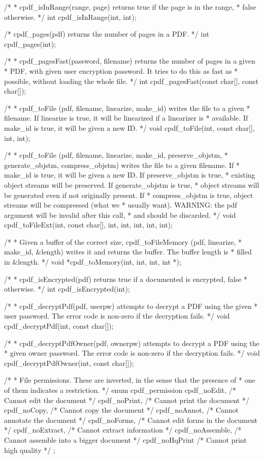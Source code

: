 /*
 * cpdf_isInRange(range, page) returns true if the page is in the range,
 * false otherwise.
 */
int cpdf_isInRange(int, int);

/* cpdf_pages(pdf) returns the number of pages in a PDF. */
int cpdf_pages(int);

/*
 * cpdf_pagesFast(password, filename) returns the number of pages in a given
 * PDF, with given user encryption password. It tries to do this as fast as
 * possible, without loading the whole file.
 */
int cpdf_pagesFast(const char[], const char[]);

/*
 * cpdf_toFile (pdf, filename, linearize, make_id) writes the file to a given
 * filename. If linearize is true, it will be linearized if a linearizer is
 * available. If make_id is true, it will be given a new ID.
 */
void cpdf_toFile(int, const char[], int, int);

/*
 * cpdf_toFile (pdf, filename, linearize, make_id, preserve_objstm,
 * generate_objstm, compress_objstm) writes the file to a given filename. If
 * make_id is true, it will be given a new ID.  If preserve_objstm is true,
 * existing object streams will be preserved. If generate_objstm is true,
 * object streams will be generated even if not originally present. If
 * compress_objstm is true, object streams will be compressed (what we
 * usually want). WARNING: the pdf argument will be invalid after this call,
 * and should be discarded.
 */
void cpdf_toFileExt(int, const char[], int, int, int, int, int);

/*
 * Given a buffer of the correct size, cpdf_toFileMemory (pdf, linearize,
 * make_id, &length) writes it and returns the buffer. The buffer length is
 * filled in &length.
 */
void *cpdf_toMemory(int, int, int, int *);

/*
 * cpdf_isEncrypted(pdf) returns true if a documented is encrypted, false
 * otherwise.
 */
int cpdf_isEncrypted(int);

/*
 * cpdf_decryptPdf(pdf, userpw) attempts to decrypt a PDF using the given
 * user password. The error code is non-zero if the decryption fails.
 */
void cpdf_decryptPdf(int, const char[]);

/*
 * cpdf_decryptPdfOwner(pdf, ownerpw) attempts to decrypt a PDF using the
 * given owner password. The error code is non-zero if the decryption fails.
 */
void cpdf_decryptPdfOwner(int, const char[]);

/*
 * File permissions. These are inverted, in the sense that the presence of
 * one of them indicates a restriction.
 */
enum cpdf_permission {
  cpdf_noEdit,     /* Cannot edit the document */
  cpdf_noPrint,    /* Cannot print the document */
  cpdf_noCopy,     /* Cannot copy the document */
  cpdf_noAnnot,    /* Cannot annotate the document */
  cpdf_noForms,    /* Cannot edit forms in the document */
  cpdf_noExtract,  /* Cannot extract information */
  cpdf_noAssemble, /* Cannot assemble into a bigger document */
  cpdf_noHqPrint   /* Cannot print high quality */
};

